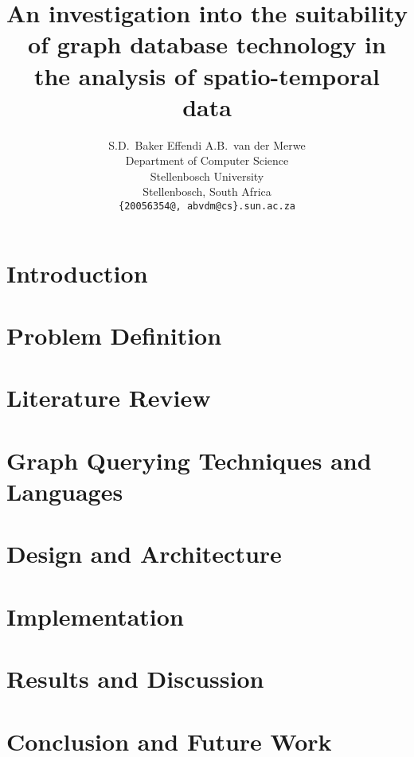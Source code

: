 \documentclass{article}
\title{An investigation into the suitability of graph database technology in the analysis of spatio-temporal data}
\author{
  S.D.~Baker Effendi \qquad  A.B.~van der Merwe \\
  Department of Computer Science\\
  Stellenbosch University\\
  Stellenbosch, South Africa \\
  \texttt{\{20056354@, abvdm@cs\}.sun.ac.za} \\
}
\begin{document}
\maketitle



\twocolumn

\section{Introduction}

\FloatBarrier

\section{Problem Definition}
\label{sec:prob-def}

\FloatBarrier

\section{Literature Review}
\label{sec:lit-rev}

\FloatBarrier

\section{Graph Querying Techniques and Languages}
\label{sec:graph-lang}

\FloatBarrier

\section{Design and Architecture}
\label{sec:des-arch}

\FloatBarrier

\section{Implementation}
\label{sec:impl}

\FloatBarrier

\section{Results and Discussion}
\label{sec:experiments}

\FloatBarrier

\section{Conclusion and Future Work}
\label{sec:conclusion}

\FloatBarrier

\newpage



\end{document}
